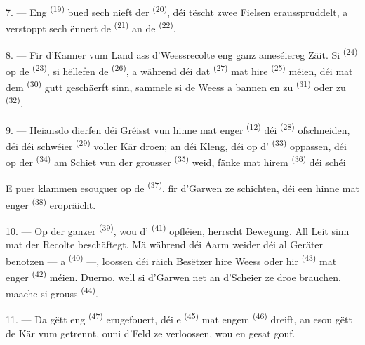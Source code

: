7. --- Eng  \textsuperscript{(19)} bued sech nieft der
 \textsuperscript{(20)}, déi tëscht zwee Fielsen erausspruddelt, a
verstoppt sech ënnert de  \textsuperscript{(21)} an de
 \textsuperscript{(22)}.

\VUsaut{5.0mm}
\VUsaut{3.4mm}

8. --- Fir d'Kanner vum Land ass d'Weessrecolte eng ganz ameséiereg Zäit. Si
 \textsuperscript{(24)} op de 
\textsuperscript{(23)}, si hëllefen de  \textsuperscript{(26)}, a
während déi dat  \textsuperscript{(27)} mat hire 
\textsuperscript{(25)} méien, déi mat dem  \textsuperscript{(30)}
gutt geschäerft sinn, sammele si de Weess a bannen en zu 
\textsuperscript{(31)} oder zu  \textsuperscript{(32)}.

9. --- Heiansdo dierfen déi Gréisst vun hinne mat enger 
\textsuperscript{(12)} déi  \textsuperscript{(28)}
ofschneiden, déi déi schwéier  \textsuperscript{(29)} voller Kär droen;
an déi Kleng, déi op d' \textsuperscript{(33)} oppassen, déi op der
 \textsuperscript{(34)} am Schiet vun der grousser 
\textsuperscript{(35)} weid, fänke mat hirem  \textsuperscript{(36)} déi
schéi 

E puer klammen esouguer op de  \textsuperscript{(37)}, fir d'Garwen ze
schichten, déi een hinne mat enger  \textsuperscript{(38)}
eropräicht.

10. --- Op der ganzer  \textsuperscript{(39)}, wou d'
\textsuperscript{(41)} opfléien, herrscht Bewegung. All Leit sinn mat der Recolte
beschäftegt. Mä während déi Aarm weider déi al Geräter benotzen ---
 a  \textsuperscript{(40)} ---,
loossen déi räich Besëtzer hire Weess oder hir  \textsuperscript{(43)} mat
enger  \textsuperscript{(42)} méien. Duerno, well si d'Garwen net
an d'Scheier ze droe brauchen, maache si grouss 
\textsuperscript{(44)}.

11. --- Da gëtt eng  \textsuperscript{(47)}
erugefouert, déi e  \textsuperscript{(45)} mat engem
 \textsuperscript{(46)} dreift, an esou gëtt de Kär vum
 getrennt, ouni d'Feld ze verloossen, wou en gesat gouf.

